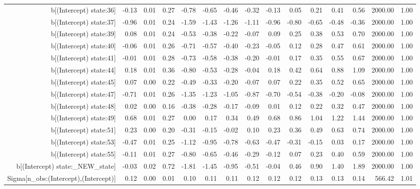 \begin{table}[ht]
\begin{tabular}{rrrrrrrrrrrrrrr}
  b[(Intercept) state:36] & -0.13 & 0.01 & 0.27 & -0.78 & -0.65 & -0.46 & -0.32 & -0.13 & 0.05 & 0.21 & 0.41 & 0.56 & 2000.00 & 1.00 \\ 
  b[(Intercept) state:37] & -0.96 & 0.01 & 0.24 & -1.59 & -1.43 & -1.26 & -1.11 & -0.96 & -0.80 & -0.65 & -0.48 & -0.36 & 2000.00 & 1.00 \\ 
  b[(Intercept) state:39] & 0.08 & 0.01 & 0.24 & -0.53 & -0.38 & -0.22 & -0.07 & 0.09 & 0.25 & 0.38 & 0.53 & 0.70 & 2000.00 & 1.00 \\ 
  b[(Intercept) state:40] & -0.06 & 0.01 & 0.26 & -0.71 & -0.57 & -0.40 & -0.23 & -0.05 & 0.12 & 0.28 & 0.47 & 0.61 & 2000.00 & 1.00 \\ 
  b[(Intercept) state:41] & -0.01 & 0.01 & 0.28 & -0.73 & -0.58 & -0.38 & -0.20 & -0.01 & 0.17 & 0.35 & 0.55 & 0.67 & 2000.00 & 1.00 \\ 
  b[(Intercept) state:44] & 0.18 & 0.01 & 0.36 & -0.80 & -0.53 & -0.28 & -0.04 & 0.18 & 0.42 & 0.64 & 0.88 & 1.09 & 2000.00 & 1.00 \\ 
  b[(Intercept) state:45] & 0.07 & 0.00 & 0.22 & -0.49 & -0.33 & -0.20 & -0.07 & 0.07 & 0.22 & 0.35 & 0.52 & 0.65 & 2000.00 & 1.00 \\ 
  b[(Intercept) state:47] & -0.71 & 0.01 & 0.26 & -1.35 & -1.23 & -1.05 & -0.87 & -0.70 & -0.54 & -0.38 & -0.20 & -0.08 & 2000.00 & 1.00 \\ 
  b[(Intercept) state:48] & 0.02 & 0.00 & 0.16 & -0.38 & -0.28 & -0.17 & -0.09 & 0.01 & 0.12 & 0.22 & 0.32 & 0.47 & 2000.00 & 1.00 \\ 
  b[(Intercept) state:49] & 0.68 & 0.01 & 0.27 & 0.00 & 0.17 & 0.34 & 0.49 & 0.68 & 0.86 & 1.04 & 1.22 & 1.44 & 2000.00 & 1.00 \\ 
  b[(Intercept) state:51] & 0.23 & 0.00 & 0.20 & -0.31 & -0.15 & -0.02 & 0.10 & 0.23 & 0.36 & 0.49 & 0.63 & 0.74 & 2000.00 & 1.00 \\ 
  b[(Intercept) state:53] & -0.47 & 0.01 & 0.25 & -1.12 & -0.95 & -0.78 & -0.63 & -0.47 & -0.31 & -0.15 & 0.03 & 0.17 & 2000.00 & 1.00 \\ 
  b[(Intercept) state:55] & -0.11 & 0.01 & 0.27 & -0.80 & -0.65 & -0.46 & -0.29 & -0.12 & 0.07 & 0.23 & 0.40 & 0.59 & 2000.00 & 1.00 \\ 
  b[(Intercept) state:\_NEW\_state] & -0.03 & 0.02 & 0.72 & -1.81 & -1.45 & -0.95 & -0.51 & -0.04 & 0.46 & 0.90 & 1.40 & 1.89 & 2000.00 & 1.00 \\ 
  Sigma[n\_obs:(Intercept),(Intercept)] & 0.12 & 0.00 & 0.01 & 0.10 & 0.11 & 0.11 & 0.12 & 0.12 & 0.12 & 0.13 & 0.13 & 0.14 & 566.42 & 1.01 \\ 

\end{tabular}
\end{table}
